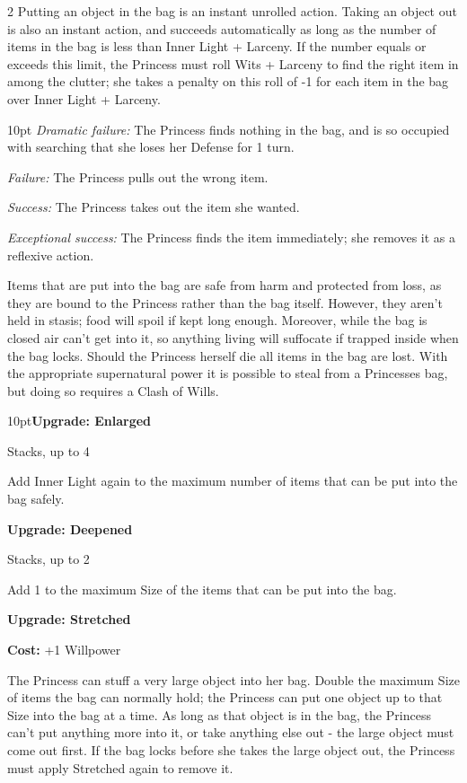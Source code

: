 \begin{multicols}{2}
Putting an object in the bag is an instant unrolled action. Taking an object out is also an instant action, and succeeds automatically as long as the number of items in the bag is less than Inner Light + Larceny. If the number equals or exceeds this limit, the Princess must roll Wits + Larceny to find the right item in among the clutter; she takes a penalty on this roll of -1 for each item in the bag over Inner Light + Larceny.

\begin{myindentpar}{10pt}    \emph{Dramatic failure:} The Princess finds nothing in the bag, and is so occupied with searching that she loses her Defense for 1 turn.

    \emph{Failure:} The Princess pulls out the wrong item.

    \emph{Success:} The Princess takes out the item she wanted.

    \emph{Exceptional success:} The Princess finds the item immediately; she removes it as a reflexive action.\end{myindentpar}

Items that are put into the bag are safe from harm and protected from loss, as they are bound to the Princess rather than the bag itself. However, they aren't held in stasis; food will spoil if kept long enough. Moreover, while the bag is closed air can't get into it, so anything living will suffocate if trapped inside when the bag locks. Should the Princess herself die all items in the bag are lost. With the appropriate supernatural power it is possible to steal from a Princesses bag, but doing so requires a Clash of Wills.

\begin{myindentpar}{10pt}\textbf{Upgrade: Enlarged}

Stacks, up to 4

Add Inner Light again to the maximum number of items that can be put into the bag safely.

\textbf{Upgrade: Deepened}

Stacks, up to 2

Add 1 to the maximum Size of the items that can be put into the bag.

\textbf{Upgrade: Stretched}

\noindent \textbf{Cost:} +1 Willpower

The Princess can stuff a very large object into her bag. Double the maximum Size of items the bag can normally hold; the Princess can put one object up to that Size into the bag at a time. As long as that object is in the bag, the Princess can't put anything more into it, or take anything else out - the large object must come out first. If the bag locks before she takes the large object out, the Princess must apply Stretched again to remove it.


\end{myindentpar}
\end{multicols}
